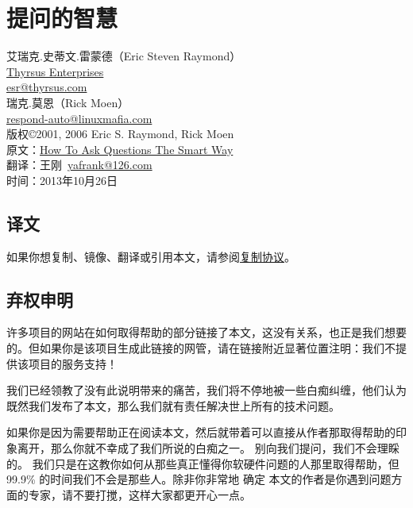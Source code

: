 \chapter{提问的智慧}

\begin{center}
艾瑞克.史蒂文.雷蒙德（Eric Steven Raymond）\\
\href{http://www.catb.org/~esr/}{Thyrsus Enterprises}\\
\href{esr@thyrsus.com}{esr@thyrsus.com}\\
瑞克.莫恩（Rick Moen）\\
\href{respond-auto@linuxmafia.com}{respond-auto@linuxmafia.com}\\
\vspace{20pt}
版权©2001, 2006 Eric S. Raymond, Rick Moen\\
原文：\href{http://www.catb.org/~esr/faqs/smart-questions.html}{How To Ask Questions The Smart Way}\\
翻译\cite{smart_question}：王刚~\href{yafrank@126.com}{yafrank@126.com}\\
时间：2013年10月26日\\
\end{center}





\section{译文}

如果你想复制、镜像、翻译或引用本文，请参阅\href{http://www.catb.org/~esr/copying.html}{复制协议}。




\section{弃权申明}


许多项目的网站在如何取得帮助的部分链接了本文，这没有关系，也正是我们想要的。但如果你是该项目生成此链接的网管，请在链接附近显著位置注明：我们不提供该项目的服务支持！

我们已经领教了没有此说明带来的痛苦，我们将不停地被一些白痴纠缠，他们认为既然我们发布了本文，那么我们就有责任解决世上所有的技术问题。

如果你是因为需要帮助正在阅读本文，然后就带着可以直接从作者那取得帮助的印象离开，那么你就不幸成了我们所说的白痴之一。 别向我们提问，我们不会理睬的。 我们只是在这教你如何从那些真正懂得你软硬件问题的人那里取得帮助，但 99.9\% 的时间我们不会是那些人。除非你非常地 确定 本文的作者是你遇到问题方面的专家，请不要打搅，这样大家都更开心一点。






